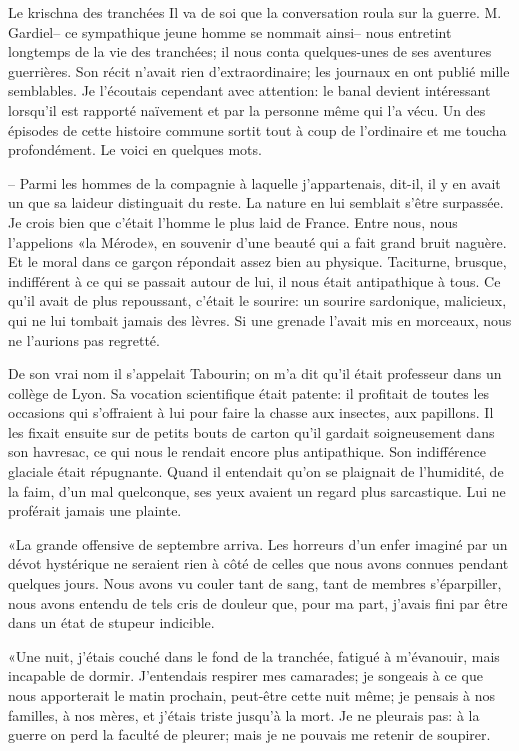 \begin{chapter}{Le krischna des tranchées}
Il va de soi que la conversation roula sur la guerre. M. Gardiel-- ce
sympathique jeune homme se nommait ainsi-- nous entretint longtemps de la
vie des tranchées; il nous conta quelques-unes de ses aventures
guerrières. Son récit n'avait rien d'extraordinaire; les journaux en
ont publié mille semblables. Je l'écoutais cependant avec attention: le
banal devient intéressant lorsqu'il est rapporté naïvement et par la
personne même qui l'a vécu. Un des épisodes de cette histoire commune
sortit tout à coup de l'ordinaire et me toucha profondément. Le voici en
quelques mots.

-- Parmi les hommes de la compagnie à laquelle j'appartenais, dit-il, il
y en avait un que sa laideur distinguait du reste. La nature en lui
semblait s'être surpassée. Je crois bien que c'était l'homme le plus
laid de France. Entre nous, nous l'appelions «la Mérode», en souvenir
d'une beauté qui a fait grand bruit naguère. Et le moral dans ce garçon
répondait assez bien au physique. Taciturne, brusque, indifférent à ce
qui se passait autour de lui, il nous était antipathique à tous. Ce
qu'il avait de plus repoussant, c'était le sourire: un sourire
sardonique, malicieux, qui ne lui tombait jamais des lèvres. Si une
grenade l'avait mis en morceaux, nous ne l'aurions pas regretté.

De son vrai nom il s'appelait Tabourin; on m'a dit qu'il était
professeur dans un collège de Lyon. Sa vocation scientifique était
patente: il profitait de toutes les occasions qui s'offraient à lui pour
faire la chasse aux insectes, aux papillons. Il les fixait ensuite sur
de petits bouts de carton qu'il gardait soigneusement dans son havresac,
ce qui nous le rendait encore plus antipathique. Son indifférence
glaciale était répugnante. Quand il entendait qu'on se plaignait de
l'humidité, de la faim, d'un mal quelconque, ses yeux avaient un regard
plus sarcastique. Lui ne proférait jamais une plainte.

«La grande offensive de septembre arriva. Les horreurs d'un enfer
imaginé par un dévot hystérique ne seraient rien à côté de celles que
nous avons connues pendant quelques jours. Nous avons vu couler tant de
sang, tant de membres s'éparpiller, nous avons entendu de tels cris de
douleur que, pour ma part, j'avais fini par être dans un état de stupeur
indicible.

«Une nuit, j'étais couché dans le fond de la tranchée, fatigué à
m'évanouir, mais incapable de dormir. J'entendais respirer mes
camarades; je songeais à ce que nous apporterait le matin prochain,
peut-être cette nuit même; je pensais à nos familles, à nos mères, et
j'étais triste jusqu'à la mort. Je ne pleurais pas: à la guerre on perd
la faculté de pleurer; mais je ne pouvais me retenir de soupirer.


\end{chapter}
